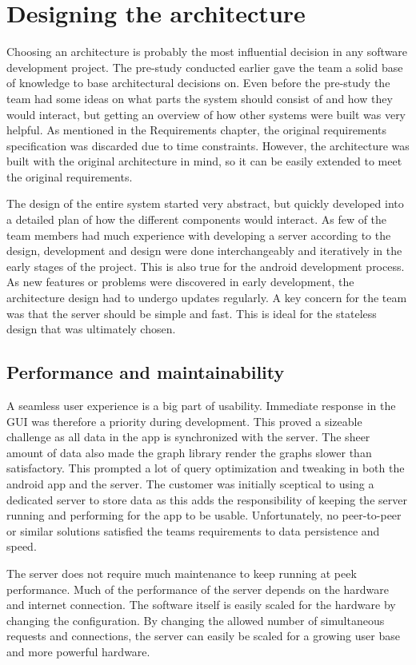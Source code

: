 \section{Designing the architecture}
Choosing an architecture is probably the most influential decision in any software development project. The pre-study conducted earlier gave the team a solid base of knowledge to base architectural 
decisions on. Even before the pre-study the team had some ideas on what parts the system should consist of and how they would interact, but getting an overview of how other systems were built was 
very helpful. As mentioned in the Requirements chapter, the original requirements specification was discarded due to time constraints. However, the architecture was built with the original architecture in mind, so it can be easily extended to meet the original requirements.

The design of the entire system started very abstract, but quickly developed into a detailed plan of how the different components would interact. As few of the team members had much 
experience with developing a server according to the design, development and design were done interchangeably and iteratively in the early stages of the project. This is also true for the 
android development process. As new features or problems were discovered in early development, the architecture design had to undergo updates regularly. A key concern for the team was that the 
server should be simple and fast. This is ideal for the stateless design that was ultimately chosen. 

\subsection{Performance and maintainability}
A seamless user experience is a big part of usability. Immediate response in the GUI was therefore a priority during development. This proved a sizeable challenge as all data in the 
app is synchronized with the server. The sheer amount of data also made the graph library render the graphs slower than satisfactory. This prompted a lot of query optimization and tweaking 
in both the android app and the server. The customer was initially sceptical to using a dedicated server to store data as this adds the responsibility of keeping the server running and performing 
for the app to be usable. Unfortunately, no peer-to-peer or similar solutions satisfied the teams requirements to data persistence and speed.

The server does not require much maintenance to keep running at peek performance. Much of the performance of the server depends on the hardware and internet connection. 
The software itself is easily scaled for the hardware by changing the configuration. By changing the allowed number of simultaneous requests and connections, the server can easily be 
scaled for a growing user base and more powerful hardware.

